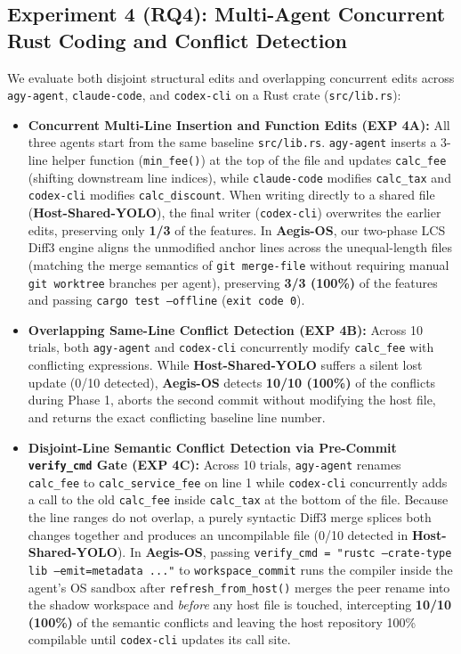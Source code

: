 \documentclass[10pt,twocolumn]{article}
\begin{document}
\subsection{Experiment 4 (RQ4): Multi-Agent Concurrent Rust Coding and Conflict Detection}

We evaluate both disjoint structural edits and overlapping concurrent edits across \texttt{agy-agent}, \texttt{claude-code}, and \texttt{codex-cli} on a Rust crate (\texttt{src/lib.rs}):
\begin{itemize}
    \item \textbf{Concurrent Multi-Line Insertion and Function Edits (EXP 4A):} All three agents start from the same baseline \texttt{src/lib.rs}. \texttt{agy-agent} inserts a 3-line helper function (\texttt{min\_fee()}) at the top of the file and updates \texttt{calc\_fee} (shifting downstream line indices), while \texttt{claude-code} modifies \texttt{calc\_tax} and \texttt{codex-cli} modifies \texttt{calc\_discount}. When writing directly to a shared file (\textbf{Host-Shared-YOLO}), the final writer (\texttt{codex-cli}) overwrites the earlier edits, preserving only \textbf{1/3} of the features. In \textbf{Aegis-OS}, our two-phase LCS Diff3 engine aligns the unmodified anchor lines across the unequal-length files (matching the merge semantics of \texttt{git merge-file} without requiring manual \texttt{git worktree} branches per agent), preserving \textbf{3/3 (100\%)} of the features and passing \texttt{cargo test --offline} (\texttt{exit code 0}).
    \item \textbf{Overlapping Same-Line Conflict Detection (EXP 4B):} Across 10 trials, both \texttt{agy-agent} and \texttt{codex-cli} concurrently modify \texttt{calc\_fee} with conflicting expressions. While \textbf{Host-Shared-YOLO} suffers a silent lost update (0/10 detected), \textbf{Aegis-OS} detects \textbf{10/10 (100\%)} of the conflicts during Phase 1, aborts the second commit without modifying the host file, and returns the exact conflicting baseline line number.
    \item \textbf{Disjoint-Line Semantic Conflict Detection via Pre-Commit \texttt{verify\_cmd} Gate (EXP 4C):} Across 10 trials, \texttt{agy-agent} renames \texttt{calc\_fee} to \texttt{calc\_service\_fee} on line 1 while \texttt{codex-cli} concurrently adds a call to the old \texttt{calc\_fee} inside \texttt{calc\_tax} at the bottom of the file. Because the line ranges do not overlap, a purely syntactic Diff3 merge splices both changes together and produces an uncompilable file (0/10 detected in \textbf{Host-Shared-YOLO}). In \textbf{Aegis-OS}, passing \texttt{verify\_cmd = "rustc --crate-type lib --emit=metadata ..."} to \texttt{workspace\_commit} runs the compiler inside the agent's OS sandbox after \texttt{refresh\_from\_host()} merges the peer rename into the shadow workspace and \emph{before} any host file is touched, intercepting \textbf{10/10 (100\%)} of the semantic conflicts and leaving the host repository 100\% compilable until \texttt{codex-cli} updates its call site.

\end{itemize}
\end{document}
